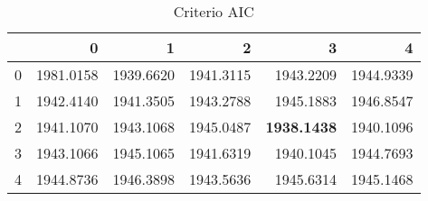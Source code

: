 \begin{table}[H]
\label{tab:autoarima_aic}
\centering
\begin{tabular}{lrrrrr}
\toprule
 & 0 & 1 & 2 & 3 & 4 \\
\midrule
0 & 1981.0158 & 1939.6620 & 1941.3115 & 1943.2209 & 1944.9339 \\
1 & 1942.4140 & 1941.3505 & 1943.2788 & 1945.1883 & 1946.8547 \\
2 & 1941.1070 & 1943.1068 & 1945.0487 & \textbf{1938.1438} & 1940.1096 \\
3 & 1943.1066 & 1945.1065 & 1941.6319 & 1940.1045 & 1944.7693 \\
4 & 1944.8736 & 1946.3898 & 1943.5636 & 1945.6314 & 1945.1468 \\
\bottomrule
\end{tabular}
\caption{Criterio AIC}
\end{table}
